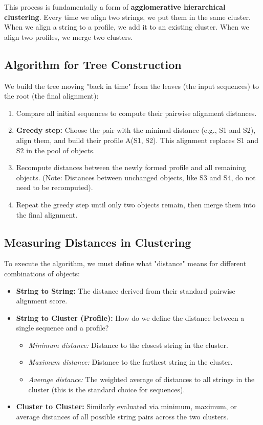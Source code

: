 \documentclass[11pt, a4paper]{article}
\begin{document}
This process is fundamentally a form of \textbf{agglomerative hierarchical clustering}. 
Every time we align two strings, we put them in the same cluster. When we align a string to a profile, we add it to an existing cluster. When we align two profiles, we merge two clusters.

\subsection{Algorithm for Tree Construction}
We build the tree moving "back in time" from the leaves (the input sequences) to the root (the final alignment):
\begin{enumerate}
    \item Compare all initial sequences to compute their pairwise alignment distances.
    \item \textbf{Greedy step:} Choose the pair with the minimal distance (e.g., S1 and S2), align them, and build their profile A(S1, S2). This alignment replaces S1 and S2 in the pool of objects.
    \item Recompute distances between the newly formed profile and all remaining objects. (Note: Distances between unchanged objects, like S3 and S4, do not need to be recomputed).
    \item Repeat the greedy step until only two objects remain, then merge them into the final alignment.
\end{enumerate}

\subsection{Measuring Distances in Clustering}
To execute the algorithm, we must define what "distance" means for different combinations of objects:

\begin{itemize}
    \item \textbf{String to String:} The distance derived from their standard pairwise alignment score.
    \item \textbf{String to Cluster (Profile):} How do we define the distance between a single sequence and a profile?
        \begin{itemize}
            \item \textit{Minimum distance:} Distance to the closest string in the cluster.
            \item \textit{Maximum distance:} Distance to the farthest string in the cluster.
            \item \textit{Average distance:} The weighted average of distances to all strings in the cluster (this is the standard choice for sequences).
        \end{itemize}
    \item \textbf{Cluster to Cluster:} Similarly evaluated via minimum, maximum, or average distances of all possible string pairs across the two clusters.
\end{itemize}
\end{document}
